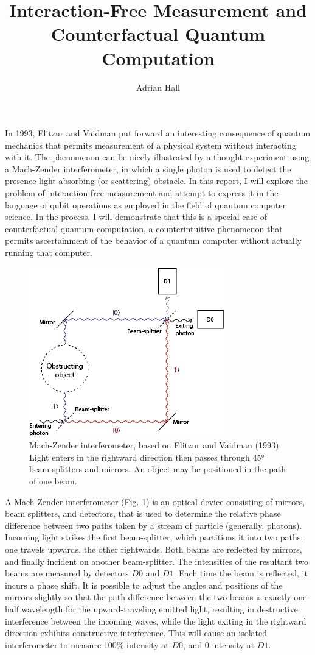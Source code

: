 \documentclass{article}
\author{Adrian Hall}
\title{Interaction-Free Measurement and Counterfactual Quantum Computation}
\begin{document}
\maketitle

In 1993, Elitzur and Vaidman put forward an interesting consequence of quantum mechanics that permits measurement of a physical system without interacting with it. The phenomenon can be nicely illustrated by a thought-experiment using a Mach-Zender interferometer, in which a single photon is used to detect the presence light-absorbing (or scattering) obstacle. In this report, I will explore the problem of interaction-free measurement and attempt to express it in the language of qubit operations as employed in the field of quantum computer science. In the process, I will demonstrate that this is a special case of counterfactual quantum computation, a counterintuitive phenomenon that permits ascertainment of the behavior of a quantum computer without actually running that computer.

\begin{figure} \label{fig:interferometer}
\includegraphics[scale=0.8]{mach-zender}
\centering
\caption{Mach-Zender interferometer, based on Elitzur and Vaidman (1993). Light enters in the rightward direction then passes through 45° beam-splitters and mirrors. An object may be positioned in the path of one beam.}
\end{figure}

A Mach-Zender interferometer (Fig. \ref{fig:interferometer}) is an optical device consisting of mirrors, beam splitters, and detectors, that is used to determine the relative phase difference between two paths taken by a stream of particle (generally, photons). Incoming light strikes the first beam-splitter, which partitions it into two paths; one travels upwards, the other rightwards. Both beams are reflected by mirrors, and finally incident on another beam-splitter. The intensities of the resultant two beams are measured by detectors $D0$ and $D1$. Each time the beam is reflected, it incurs a phase shift. It is possible to adjust the angles and positions of the mirrors slightly so that the path difference between the two beams is exactly one-half wavelength for the upward-traveling emitted light, resulting in destructive interference between the incoming waves, while the light exiting in the rightward direction exhibits constructive interference. This will cause an isolated interferometer to measure 100\% intensity at $D0$, and 0 intensity at $D1$.
\end{document}
